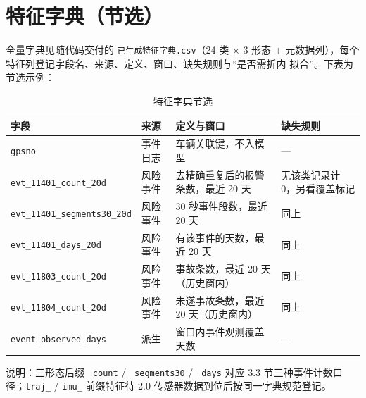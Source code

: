 \section{特征字典（节选）}

全量字典见随代码交付的 \texttt{已生成特征字典.csv}（24 类 $\times$ 3 形态 +
元数据列），每个特征列登记字段名、来源、定义、窗口、缺失规则与“是否需折内
拟合”。下表为节选示例：

\begin{table}[H]
\centering
\caption{特征字典节选}
\label{tab:dict}
\small
\begin{tabularx}{\textwidth}{llLL}
\toprule
字段 & 来源 & 定义与窗口 & 缺失规则 \\
\midrule
\texttt{gpsno} & 事件日志 & 车辆关联键，不入模型 & --- \\
\texttt{evt\_11401\_count\_20d} & 风险事件 & 去精确重复后的报警条数，最近 20 天 & 无该类记录计 0，另看覆盖标记 \\
\texttt{evt\_11401\_segments30\_20d} & 风险事件 & 30 秒事件段数，最近 20 天 & 同上 \\
\texttt{evt\_11401\_days\_20d} & 风险事件 & 有该事件的天数，最近 20 天 & 同上 \\
\texttt{evt\_11803\_count\_20d} & 风险事件 & 事故条数，最近 20 天（历史窗内） & 同上 \\
\texttt{evt\_11804\_count\_20d} & 风险事件 & 未遂事故条数，最近 20 天（历史窗内） & 同上 \\
\texttt{event\_observed\_days} & 派生 & 窗口内事件观测覆盖天数 & --- \\
\bottomrule
\end{tabularx}
\end{table}

\noindent 说明：三形态后缀 \texttt{\_count} / \texttt{\_segments30} / \texttt{\_days}
对应 3.3 节三种事件计数口径；\texttt{traj\_} / \texttt{imu\_} 前缀特征待 2.0
传感器数据到位后按同一字典规范登记。
